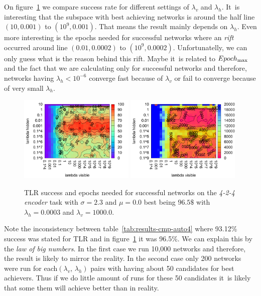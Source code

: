 On figure~\ref{fig:results-tlr-auto4-performance} we compare success rate for different settings of $\lambda_v$ and $\lambda_h$. It~is interesting that the subspace with best achieving networks is around the half line $(10, 0.001)$ to $(10^9, 0.001)$. That means the result mainly depends on $\lambda_h$. Even more interesting is the epochs needed for successful networks where an \emph{rift} occurred around line $(0.01, 0.0002)$ to $(10^9, 0.0002)$. Unfortunatelly, we can only guess what is the reason behind this rift. Maybe it~is related to $Epoch_{\rm max}$ and the fact that we are calculating only for successful networks and therefore, networks having $\lambda_h < 10^{-6}$ converge fast because of $\lambda_v$ or fail to converge because of very small $\lambda_h$. 

\begin{figure}[H]
  \centering
  \includegraphics[width=0.49\textwidth]{img/tlr-auto4-success.pdf}   
  \includegraphics[width=0.49\textwidth]{img/tlr-auto4-epoch.pdf}     
  \caption{TLR success and epochs needed for successful networks on the \emph{4-2-4 encoder} task with $\sigma = 2.3$ and $\mu = 0.0$ best being $96.5\$$ with $\lambda_h=0.0003$ and $\lambda_v=1000.0$.}
  \label{fig:results-tlr-auto4-performance}
\end{figure}

Note the inconsistency between table~\ref{tab:results-cmp-auto4} where 93.12\% success was stated for TLR and in figure~\ref{fig:results-tlr-auto4-performance} it was 96.5\%. We can explain this by the \emph{law of big numbers}. In the first case we run 10,000 networks and therefore, the result is likely to mirror the reality. In the second case only 200 networks were run for each$(\lambda_v,\,\lambda_h)$ pairs with having about 50 candidates for best achievers. Thus if we do little amount of runs for these 50 candidates it~is likely that some them will achieve better than in reality. 

